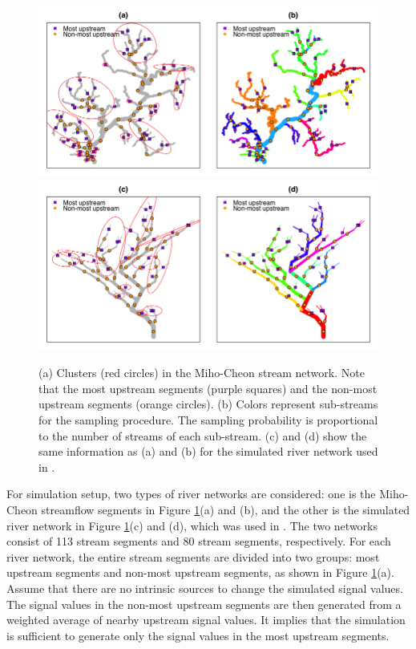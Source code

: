 \documentclass[11pt,titlepage]{article}
\begin{document}
\begin{figure}
	\centering\includegraphics[width=1\textwidth]{Stream_result/Stream_cluster_maps_new(5).png}
	\centering\includegraphics[width=1\textwidth]{Stream_result/Stream_cluster_maps_STPCA(2).png}
	\vspace{-10mm}\caption{(a) Clusters (red circles) in the Miho-Cheon stream network. Note that the most upstream segments (purple squares) and the non-most upstream segments (orange circles). (b) Colors represent sub-streams for the sampling procedure. The sampling probability is proportional to the number of streams of each sub-stream. (c) and (d) show the same information as (a) and (b) for the simulated river network used in \cite{Gallacher2017}.}
	\label{fig:clusterconstruction}
\end{figure}

For simulation setup, two types of river networks are considered: one is the Miho-Cheon streamflow segments in Figure \ref{fig:clusterconstruction}(a) and (b), and the other is the simulated river network in Figure \ref{fig:clusterconstruction}(c) and (d), which was used in \cite{Gallacher2017}. The two networks consist of 113 stream segments and 80 stream segments, respectively. For each river network, the entire stream segments are divided into two groups: most upstream segments and non-most upstream segments, as shown in Figure \ref{fig:clusterconstruction}(a). Assume that there are no intrinsic sources to change the simulated signal values. The signal values in the non-most upstream segments are then generated from a weighted average of nearby upstream signal values. It implies that the simulation is sufficient to generate only the signal values in the most upstream segments. 
\end{document}
